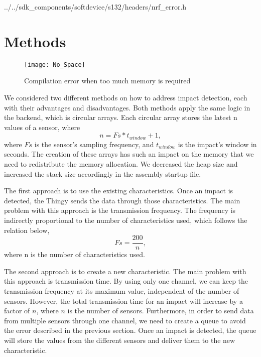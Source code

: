 
{../../sdk_components/softdevice/s132/headers/nrf_error.h}

\section{Methods}\label{sc:methods}
\begin{figure}[hbt!]
	\centering
	\texttt{[image: No\_Space]}
	\caption{Compilation error when too much memory is required}
	\label{fig:no_space}
\end{figure}
We considered two different methods on how to address impact detection, each with their advantages and disadvantages. Both methods apply the same logic in the backend, which is circular arrays. Each circular array stores the latest n values of a sensor, where
\begin{equation}\label{eq:array_samples}
	n = Fs * t_{window} + 1,
\end{equation}
where $Fs$ is the sensor's sampling frequency, and $t_{window}$ is the impact's window in seconds. The creation of these arrays has such an impact on the memory that we need to redistribute the memory allocation. We decreased the heap size and increased the stack size accordingly in the assembly startup file.

The first approach is to use the existing characteristics. Once an impact is detected, the Thingy sends the data through those characteristics. The main problem with this approach is the transmission frequency. The frequency is indirectly proportional to the number of characteristics used, which follows the relation below,
\begin{equation*}
	Fs =  \frac{200}{n},
\end{equation*}
where n is the number of characteristics used.

The second approach is to create a new characteristic. The main problem with this approach is transmission time. By using only one channel, we can keep the transmission frequency at its maximum value, independent of the number of sensors. However, the total transmission time for an impact will increase by a factor of $n$, where $n$ is the number of sensors. Furthermore, in order to send data from multiple sensors through one channel, we need to create a queue to avoid the error described in the previous section. Once an impact is detected, the queue will store the values from the different sensors and deliver them to the new characteristic.

